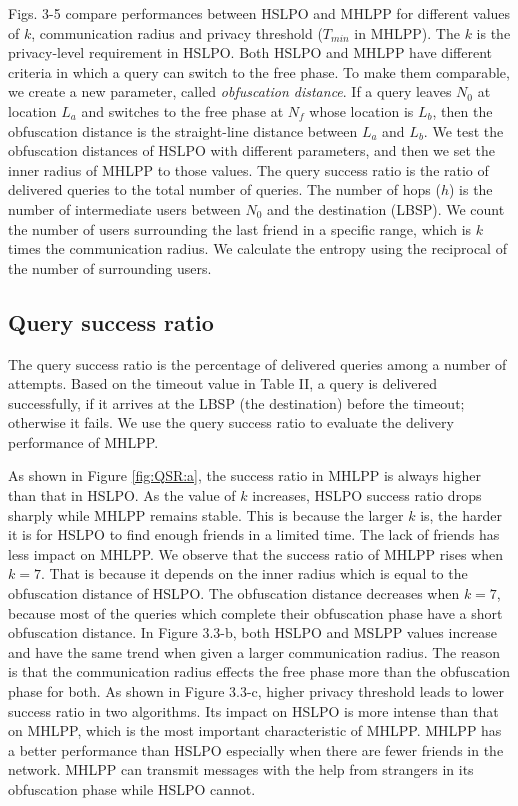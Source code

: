 \noindent Figs. 3-5 compare performances between HSLPO and MHLPP for different values of $k$, communication radius and privacy threshold (${T}_{min}$ in MHLPP). The $k$ is the privacy-level requirement in HSLPO. Both HSLPO and MHLPP have different criteria in which a query can switch to the free phase. To make them comparable, we create a new parameter, called \textit{obfuscation distance}. If a query leaves ${N}_{0}$ at location ${L}_{a}$ and switches to the free phase at ${N}_{f}$ whose location is ${L}_{b}$, then the obfuscation distance is the straight-line distance between ${L}_{a}$ and ${L}_{b}$. We test the obfuscation distances of HSLPO with different parameters, and then we set the inner radius of MHLPP to those values. The query success ratio is the ratio of delivered queries to the total number of queries. The number of hops ($h$) is the number of intermediate users between ${N}_{0}$ and the destination (LBSP). We count the number of users surrounding the last friend in a specific range, which is $k$ times the communication radius. We calculate the entropy using the reciprocal of the number of surrounding users.

\subsection{ Query success ratio}

\noindent The query success ratio is the percentage of delivered queries among a number of attempts. Based on the timeout value in Table II, a query is delivered successfully, if it arrives at the LBSP (the destination) before the timeout; otherwise it fails. We use the query success ratio to evaluate the delivery performance of MHLPP.


\noindent As shown in Figure \ref{fig:QSR:a}, the success ratio in MHLPP is always higher than that in HSLPO. As the value of $k$ increases, HSLPO success ratio drops sharply while MHLPP remains stable. This is because the larger $k$ is, the harder it is for HSLPO to find enough friends in a limited time. The lack of friends has less impact on MHLPP. We observe that the success ratio of MHLPP rises when $k=7$. That is because it depends on the inner radius which is equal to the obfuscation distance of HSLPO. The obfuscation distance decreases when $k=7$, because most of the queries which complete their obfuscation phase have a short obfuscation distance. In Figure 3.3-b, both HSLPO and MSLPP values increase and have the same trend when given a larger communication radius. The reason is that the communication radius effects the free phase more than the obfuscation phase for both. As shown in Figure 3.3-c, higher privacy threshold leads to lower success ratio in two algorithms. Its impact on HSLPO is more intense than that on MHLPP, which is the most important characteristic of MHLPP. MHLPP has a better performance than HSLPO especially when there are fewer friends in the network. MHLPP can transmit messages with the help from strangers in its obfuscation phase while HSLPO cannot. 

